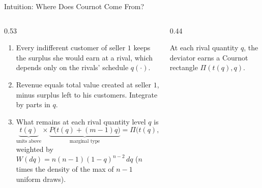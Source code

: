 \documentclass[11pt,aspectratio=169,handout]{beamer}
\def\meditem{\smallskip\item}
\begin{document}
\begin{frame}{Intuition: Where Does Cournot Come From?}
\begin{columns}[T]
\begin{column}{0.53\textwidth}
\begin{enumerate}
\item Every indifferent customer of seller $1$ keeps the surplus she would earn at a rival, which depends only on the rivals' schedule $q(\cdot)$.
\meditem Revenue equals total value created at seller $1$, minus surplus left to his customers. Integrate by parts in $q$.
\meditem<2-> What remains at each rival quantity level $q$ is
\[
\underbrace{t(q)}_{\text{units above}}\times\underbrace{P\bigl(t(q)+(m-1)q\bigr)}_{\text{marginal type}} = \Pi\bigl(t(q),q\bigr),
\]
weighted by $W(dq)=n(n-1)(1-q)^{n-2}\,dq$ ($n$ times the density of the max of $n-1$ uniform draws).
\end{enumerate}
\end{column}
\begin{column}{0.44\textwidth}
\centering
{}

{\scriptsize At each rival quantity $q$, the deviator earns a Cournot rectangle $\Pi(t(q),q)$.}
\end{column}
\end{columns}
\end{frame}
\end{document}
